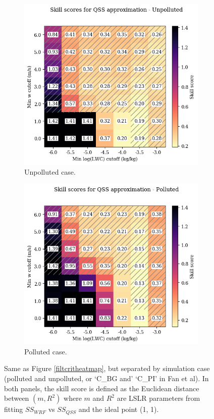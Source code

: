 \documentclass{article}
\begin{document}
\begin{figure}[ht]
	\centering
	\begin{subfigure}{0.7\textwidth}
		\includegraphics[width=\textwidth]{wrf/filtering_criteria_separate_Unpolluted_figure.png}
		\caption{Unpolluted case.}
		\label{filtcritheatmapsepunpoll}
	\end{subfigure}
	\begin{subfigure}{0.7\textwidth}
		\includegraphics[width=\textwidth]{wrf/filtering_criteria_separate_Polluted_figure.png}
		\caption{Polluted case.}
		\label{filtcritheatmapseppoll}
	\end{subfigure}
	\caption{Same as Figure \ref{filtcritheatmap}, but separated by simulation case (polluted and unpolluted, or `C\_BG and' `C\_PI' in Fan et al). In both panels, the skill score is defined as the Euclidean distance between $(m, R^2)$ where $m$ and $R^2$ are LSLR parameters from fitting $SS_{WRF}$ vs $SS_{QSS}$ and the ideal point (1, 1).}
	\label{filtcritheatmapsep}
\end{figure}
\end{document}
